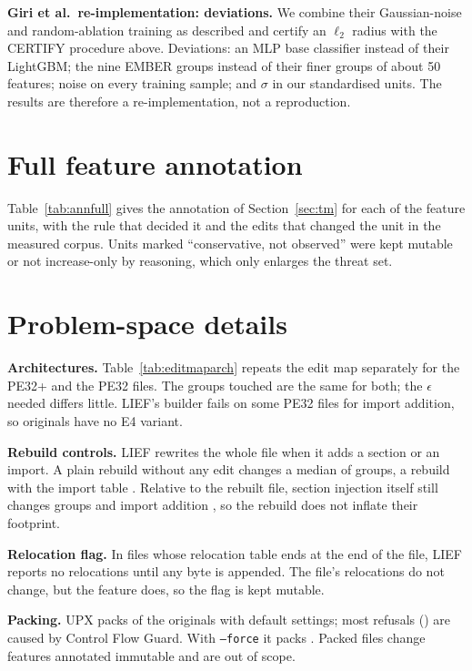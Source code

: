 \documentclass[preprint,12pt,authoryear]{elsarticle}
\begin{document}
\textbf{Giri et al.\ re-implementation: deviations.} We combine their Gaussian-noise and random-ablation training as described and certify an $\ell_2$ radius with the CERTIFY procedure above. Deviations: an MLP base classifier instead of their LightGBM; the nine EMBER groups instead of their finer groups of about 50 features; noise on every training sample; and $\sigma$ in our standardised units. The results are therefore a re-implementation, not a reproduction.

\FloatBarrier
\section{Full feature annotation}\label{app:annotation}
Table~\ref{tab:annfull} gives the annotation of Section~\ref{sec:tm} for each of the \PsNUnits{} feature units, with the rule that decided it and the edits that changed the unit in the measured corpus. Units marked ``conservative, not observed'' were kept mutable or not increase-only by reasoning, which only enlarges the threat set.

{\footnotesize

}

\FloatBarrier
\section{Problem-space details}\label{app:ps}
\textbf{Architectures.} Table~\ref{tab:editmaparch} repeats the edit map separately for the \PsNFilesPeSixtyFour{} PE32+ and the \PsNFilesPeThirtyTwo{} PE32 files. The groups touched are the same for both; the $\epsilon$ needed differs little. LIEF's builder fails on some PE32 files for import addition, so \PsNImportFail{} originals have no E4 variant.

\textbf{Rebuild controls.} LIEF rewrites the whole file when it adds a section or an import. A plain rebuild without any edit changes a median of \PsEthreeRebuildGroupsMed{} groups, a rebuild with the import table \PsEfourRebuildGroupsMed. Relative to the rebuilt file, section injection itself still changes \PsEthreeOwnGroupsMed{} groups and import addition \PsEfourOwnGroupsMed, so the rebuild does not inflate their footprint.

\textbf{Relocation flag.} In \PsNRelocArtefact{} files whose relocation table ends at the end of the file, LIEF reports no relocations until any byte is appended. The file's relocations do not change, but the feature does, so the flag is kept mutable.

\textbf{Packing.} UPX packs \PsUpxDefaultPacked{} of the \PsNFiles{} originals with default settings; most refusals (\PsUpxGuardCf) are caused by Control Flow Guard. With \texttt{--force} it packs \PsUpxForcePacked. Packed files change features annotated immutable and are out of scope.
\end{document}

